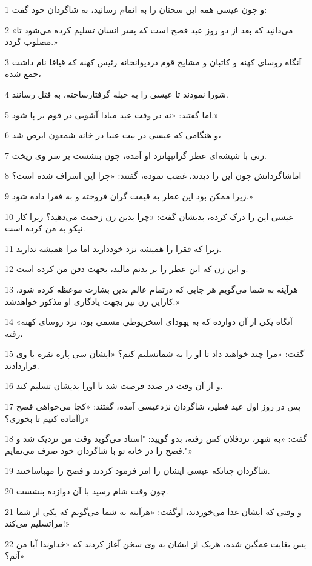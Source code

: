 \par 1 و چون عیسی همه این سخنان را به اتمام رسانید، به شاگردان خود گفت:
\par 2 «می‌دانید که بعد از دو روز عید فصح است که پسر انسان تسلیم کرده می‌شود تا مصلوب گردد.»
\par 3 آنگاه روسای کهنه و کاتبان و مشایخ قوم دردیوانخانه رئیس کهنه که قیافا نام داشت جمع شده،
\par 4 شورا نمودند تا عیسی را به حیله گرفتارساخته، به قتل رسانند.
\par 5 اما گفتند: «نه در وقت عید مبادا آشوبی در قوم بر پا شود.»
\par 6 و هنگامی که عیسی در بیت عنیا در خانه شمعون ابرص شد،
\par 7 زنی با شیشه‌ای عطر گرانبهانزد او آمده، چون بنشست بر سر وی ریخت.
\par 8 اماشاگردانش چون این را دیدند، غضب نموده، گفتند: «چرا این اسراف شده است؟
\par 9 زیرا ممکن بود این عطر به قیمت گران فروخته و به فقرا داده شود.»
\par 10 عیسی این را درک کرده، بدیشان گفت: «چرا بدین زن زحمت می‌دهید؟ زیرا کار نیکو به من کرده است.
\par 11 زیرا که فقرا را همیشه نزد خوددارید اما مرا همیشه ندارید.
\par 12 و این زن که این عطر را بر بدنم مالید، بجهت دفن من کرده است.
\par 13 هرآینه به شما می‌گویم هر جایی که درتمام عالم بدین بشارت موعظه کرده شود، کاراین زن نیز بجهت یادگاری او مذکور خواهدشد.»
\par 14 «آنگاه یکی از آن دوازده که به یهودای اسخریوطی مسمی بود، نزد روسای کهنه رفته،
\par 15 گفت: «مرا چند خواهید داد تا او را به شماتسلیم کنم؟ «ایشان سی پاره نقره با وی قراردادند.
\par 16 و از آن وقت در صدد فرصت شد تا اورا بدیشان تسلیم کند.
\par 17 پس در روز اول عید فطیر، شاگردان نزدعیسی آمده، گفتند: «کجا می‌خواهی فصح راآماده کنیم تا بخوری؟»
\par 18 گفت: «به شهر، نزدفلان کس رفته، بدو گویید: "استاد می‌گوید وقت من نزدیک شد و فصح را در خانه تو با شاگردان خود صرف می‌نمایم."»
\par 19 شاگردان چنانکه عیسی ایشان را امر فرمود کردند و فصح را مهیاساختند.
\par 20 چون وقت شام رسید با آن دوازده بنشست.
\par 21 و وقتی که ایشان غذا می‌خوردند، اوگفت: «هرآینه به شما می‌گویم که یکی از شما مراتسلیم می‌کند!»
\par 22 پس بغایت غمگین شده، هریک از ایشان به وی سخن آغاز کردند که «خداوندا آیا من آنم؟»

